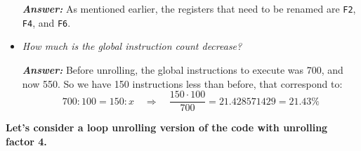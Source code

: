 \begin{itemize}
    \textcolor{Green3}{\textbf{\emph{Answer:}}} As mentioned earlier, the registers that need to be renamed are \texttt{F2}, \texttt{F4}, and \texttt{F6}.
    
    
    \item \emph{How much is the global instruction count decrease?}

    \textcolor{Green3}{\textbf{\emph{Answer:}}} Before unrolling, the global instructions to execute was 700, and now 550. So we have 150 instructions less than before, that correspond to:
    \begin{equation*}
        700 : 100 = 150 : x \quad \Rightarrow \quad \dfrac{150 \cdot 100}{700} = 21.428571429 = 21.43 \%
    \end{equation*}
\end{itemize}
\textbf{Let's consider a loop unrolling version of the code with unrolling factor 4.}

